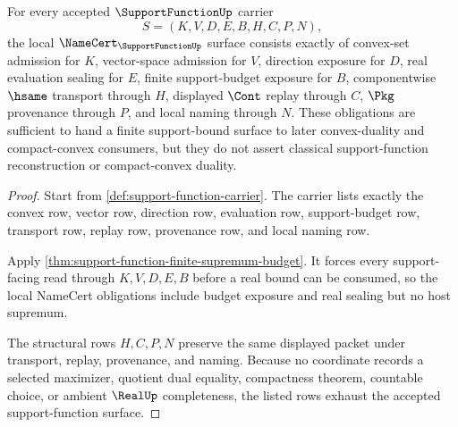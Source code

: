 \begin{theorem}
\label{thm:support-function-namecert-obligations}
For every accepted $\SupportFunctionUp$ carrier
$$
S=(K,V,D,E,B,H,C,P,N),
$$
the local $\NameCert_{\SupportFunctionUp}$ surface consists exactly of convex-set admission for $K$, vector-space admission for $V$, direction exposure for $D$, real evaluation sealing for $E$, finite support-budget exposure for $B$, componentwise $\hsame$ transport through $H$, displayed $\Cont$ replay through $C$, $\Pkg$ provenance through $P$, and local naming through $N$. These obligations are sufficient to hand a finite support-bound surface to later convex-duality and compact-convex consumers, but they do not assert classical support-function reconstruction or compact-convex duality.
\end{theorem}
\begin{proof}
Start from \autoref{def:support-function-carrier}. The carrier lists exactly the convex row, vector row, direction row, evaluation row, support-budget row, transport row, replay row, provenance row, and local naming row.

Apply \autoref{thm:support-function-finite-supremum-budget}. It forces every support-facing read through $K,V,D,E,B$ before a real bound can be consumed, so the local NameCert obligations include budget exposure and real sealing but no host supremum.

The structural rows $H,C,P,N$ preserve the same displayed packet under transport, replay, provenance, and naming. Because no coordinate records a selected maximizer, quotient dual equality, compactness theorem, countable choice, or ambient $\RealUp$ completeness, the listed rows exhaust the accepted support-function surface.
\end{proof}


\begin{closurestatus}{\SupportFunctionUp}
  \theoryclosure{\seedClosure}
  \formalstatus{\unformalizedV}
\end{closurestatus}
